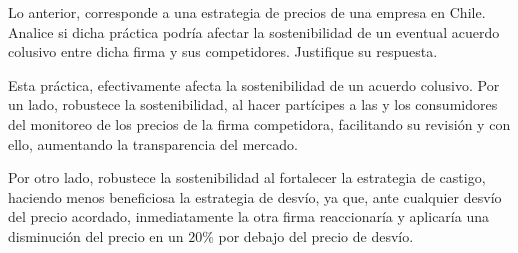 \begin{itemize}
\begin{itemize}
    Lo anterior, corresponde a una estrategia de precios de una empresa en Chile. Analice si dicha práctica podría afectar la sostenibilidad de un eventual acuerdo colusivo entre dicha firma y sus competidores. Justifique su respuesta.
    \begin{solution}
        Esta práctica, efectivamente afecta la sostenibilidad de un acuerdo colusivo. Por un lado, robustece la sostenibilidad, al hacer partícipes a las y los consumidores del monitoreo de los precios de la firma competidora, facilitando su revisión y con ello, aumentando la transparencia del mercado.

        Por otro lado, robustece la sostenibilidad al fortalecer la estrategia de castigo, haciendo menos beneficiosa la estrategia de desvío, ya que, ante cualquier desvío del precio acordado, inmediatamente la otra firma reaccionaría y aplicaría una disminución del precio en un $20 \%$ por debajo del precio de desvío.
    \end{solution}
    \end{itemize}
\end{itemize}